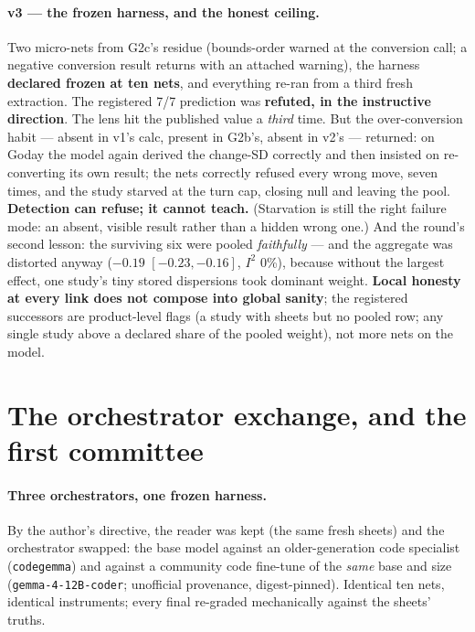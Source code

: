\documentclass[11pt]{article}
\begin{document}
\paragraph{v3 --- the frozen harness, and the honest ceiling.} Two micro-nets from G2c's residue (bounds-order warned at the conversion call; a negative conversion result returns with an attached warning), the harness \textbf{declared frozen at ten nets}, and everything re-ran from a third fresh extraction. The registered 7/7 prediction was \textbf{refuted, in the instructive direction}. The lens hit the published value a \emph{third} time. But the over-conversion habit --- absent in v1's calc, present in G2b's, absent in v2's --- returned: on Goday the model again derived the change-SD correctly and then insisted on re-converting its own result; the nets correctly refused every wrong move, seven times, and the study starved at the turn cap, closing null and leaving the pool. \textbf{Detection can refuse; it cannot teach.} (Starvation is still the right failure mode: an absent, visible result rather than a hidden wrong one.) And the round's second lesson: the surviving six were pooled \emph{faithfully} --- and the aggregate was distorted anyway ($-0.19$ $[-0.23, -0.16]$, $I^2$ 0\%), because without the largest effect, one study's tiny stored dispersions took dominant weight. \textbf{Local honesty at every link does not compose into global sanity}; the registered successors are product-level flags (a study with sheets but no pooled row; any single study above a declared share of the pooled weight), not more nets on the model.

\section{The orchestrator exchange, and the first committee}

\paragraph{Three orchestrators, one frozen harness.} By the author's directive, the reader was kept (the same fresh sheets) and the orchestrator swapped: the base model against an older-generation code specialist (\texttt{codegemma}) and against a community code fine-tune of the \emph{same} base and size (\texttt{gemma-4-12B-coder}; unofficial provenance, digest-pinned). Identical ten nets, identical instruments; every final re-graded mechanically against the sheets' truths.
\end{document}
